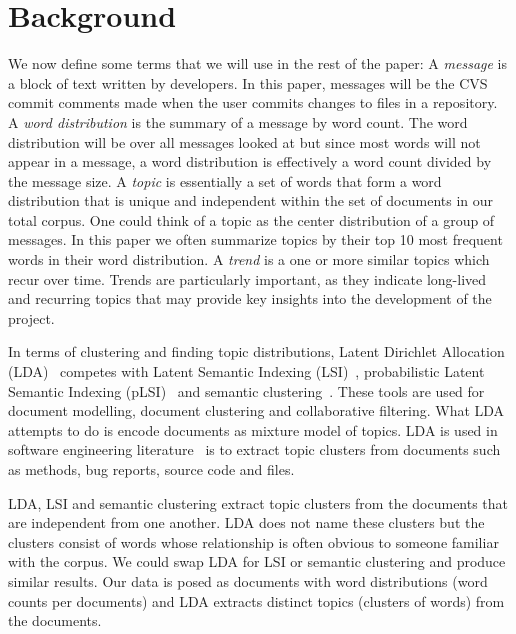 \documentclass[times, 10pt,twocolumn]{article}
\begin{document}
\section{Background}

We now define some terms that we will use in the rest of the paper: A
\emph{message} is a block of text written by developers. In this
paper, messages will be the CVS commit comments made when the user
commits changes to files in a repository. A \emph{word distribution}
is the summary of a message by word count. The word distribution will
be over all messages looked at but since most words will not appear in
a message, a word distribution is effectively a word count divided by
the message size. A \emph{topic} is essentially a set of words that
form a word distribution that is unique and independent within the set
of documents in our total corpus. One could think of a topic as the
center distribution of a group of messages. In this paper we often
summarize topics by their top 10 most frequent words in their word
distribution.  A \emph{trend} is a one or more similar topics which
recur over time.  Trends are particularly important, as they indicate
long-lived and recurring topics that may provide key insights into the
development of the project.


In terms of clustering and finding topic distributions, Latent
Dirichlet Allocation (LDA)~\cite{944937} competes with Latent Semantic
Indexing
(LSI)~\cite{1421013,1374321,10.1109/ICPC.2007.13,10.1109/ICPC.2006.17},
probabilistic Latent Semantic Indexing (pLSI)~\cite{944937} and
semantic clustering~\cite{1698774,1566153}. These tools are used for
document modelling, document clustering and collaborative
filtering. What LDA attempts to do is encode documents as mixture
model of topics.  LDA is used in software engineering
literature~\cite{lukins2008,10.1109/MSR.2007.20,NIPS2007637,1321709}
is to extract topic clusters from documents such as methods, bug
reports, source code and files.

LDA, LSI and semantic clustering extract topic
clusters from the documents that are independent from one another. LDA
does not name these clusters but the clusters consist of words whose
relationship is often obvious to someone familiar with the corpus. We
could swap LDA for LSI or semantic clustering and produce similar
results. Our data is posed as documents with word distributions (word
counts per documents) and LDA extracts distinct topics (clusters of
words) from the documents.
\end{document}
